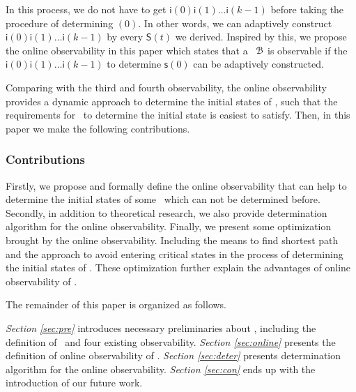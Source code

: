 In this process, we do not have to get $\mathsf{i}(0)\mathsf{i}(1)\ldots\mathsf{i}(k-1)$ before taking the procedure of determining \State$(0)$. In other words, we can adaptively construct $\mathsf{i}(0)\mathsf{i}(1)\ldots\mathsf{i}(k-1)$ by every $\mathsf{S}(t)$ we derived.  
Inspired by this, we propose the online observability in this paper which states that a \BCN\ ${\mathcal{B}}$ is observable if the $\mathsf{i}(0)\mathsf{i}(1)\ldots\mathsf{i}(k-1)$ to determine $\mathsf{s}(0)$ can be adaptively constructed. 

Comparing with the third and fourth observability, the online observability provides a dynamic approach to determine the initial states of \BCNs, such that the requirements for \BCNs\ to determine the initial state is easiest to satisfy.  
Then, in this paper we make the following contributions. 
\subsubsection*{Contributions}
Firstly, we propose and formally define the online observability that can help to determine the initial states of some \BCNs\ which can not be determined before. Secondly, in addition to theoretical research, we also provide determination algorithm for the online observability. Finally, we present some optimization brought by the online observability. Including the means to find shortest path and the approach to avoid entering critical states in the process of determining the initial states of \BCNs.  These optimization further explain the advantages of online observability of \BCNs. 

The remainder of this paper is organized as follows.

 {\em Section \ref{sec:pre}} introduces necessary preliminaries about \BCNs, including the definition of \BCNs\ and four existing observability. {\em Section \ref{sec:online}} presents the definition of online observability of \BCNs. {\em Section \ref{sec:deter}} presents determination algorithm for the online observability. 
 {\em Section \ref{sec:con}} ends up with the introduction of our future work.

